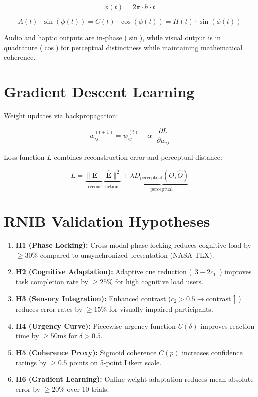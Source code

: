 \documentclass[11pt,a4paper]{article}
\begin{document}
$$
\phi(t) = 2\pi \cdot h \cdot t
$$

$$
A(t) \cdot \sin(\phi(t)) = C(t) \cdot \cos(\phi(t)) = H(t) \cdot \sin(\phi(t))
$$

Audio and haptic outputs are in-phase ($\sin$), while visual output is in quadrature ($\cos$) for perceptual distinctness while maintaining mathematical coherence.

\section{Gradient Descent Learning}
Weight updates via backpropagation:

$$
w_{ij}^{(t+1)} = w_{ij}^{(t)} - \alpha \cdot \frac{\partial L}{\partial w_{ij}}
$$

Loss function $L$ combines reconstruction error and perceptual distance:

$$
L = \underbrace{\| \mathbf{E} - \hat{\mathbf{E}} \|^2}_{\text{reconstruction}} + \lambda \underbrace{D_{\text{perceptual}}(O, \hat{O})}_{\text{perceptual}}
$$

\section{RNIB Validation Hypotheses}

\begin{enumerate}
\item \textbf{H1 (Phase Locking):} Cross-modal phase locking reduces cognitive load by $\geq 30\%$ compared to unsynchronized presentation (NASA-TLX).

\item \textbf{H2 (Cognitive Adaptation):} Adaptive cue reduction ($\lfloor 3 - 2c_1 \rfloor$) improves task completion rate by $\geq 25\%$ for high cognitive load users.

\item \textbf{H3 (Sensory Integration):} Enhanced contrast ($c_2 > 0.5 \rightarrow \text{contrast} \uparrow$) reduces error rates by $\geq 15\%$ for visually impaired participants.

\item \textbf{H4 (Urgency Curve):} Piecewise urgency function $U(\delta)$ improves reaction time by $\geq 50$ms for $\delta > 0.5$.

\item \textbf{H5 (Coherence Proxy):} Sigmoid coherence $C(p)$ increases confidence ratings by $\geq 0.5$ points on 5-point Likert scale.

\item \textbf{H6 (Gradient Learning):} Online weight adaptation reduces mean absolute error by $\geq 20\%$ over 10 trials.
\end{enumerate}
\end{document}
